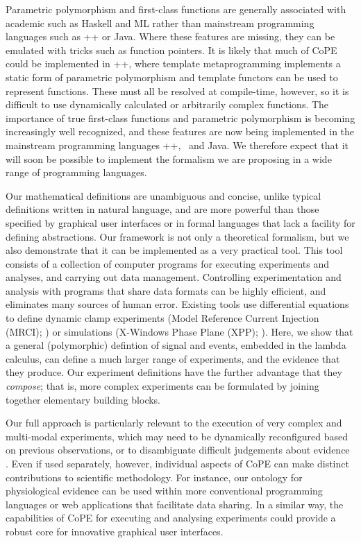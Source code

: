 Parametric polymorphism and first-class functions are generally
associated with academic such as Haskell and ML rather than mainstream
programming languages such as \C++ or Java. Where these features are
missing, they can be emulated with tricks such as function
pointers. It is likely that much of CoPE could be implemented in \C++,
where template metaprogramming implements a static form of parametric
polymorphism and template functors can be used to represent
functions. These must all be resolved at compile-time, however, so it
is difficult to use dynamically calculated or arbitrarily complex
functions. The importance of true first-class functions and parametric
polymorphism is becoming increasingly well recognized, and these
features are now being implemented in the mainstream
programming languages \C++, \Csharp\, and Java. We therefore expect
that it will soon be possible to implement the formalism we are
proposing in a wide range of programming languages.

%
% 
%
Our mathematical definitions are unambiguous and concise, unlike
typical definitions written in natural language, and are more powerful
than those specified by graphical user interfaces or in formal
languages that lack a facility for defining abstractions. Our
framework is not only a theoretical formalism, but we also demonstrate
that it can be implemented as a very practical tool. This tool
consists of a collection of computer programs for executing
experiments and analyses, and carrying out data
management. Controlling experimentation and analysis with programs
that share data formats can be highly efficient, and eliminates many
sources of human error. Existing tools use differential equations to
define dynamic clamp experiments (Model Reference Current Injection
(MRCI); \citep{Raikov2004}) or simulations (X-Windows Phase Plane
(XPP); \citep{Ermentrout1987}). Here, we show that a general
(polymorphic) defintion of signal and events, embedded in the lambda
calculus, can define a much larger range of experiments, and the
evidence that they produce. Our experiment definitions have the
further advantage that they \emph{compose}; that is, more complex
experiments can be formulated by joining together elementary building
blocks.

Our full approach is particularly relevant to the execution of very
complex and multi-modal experiments, which may need to be dynamically
reconfigured based on previous observations, or to disambiguate
difficult judgements about evidence \citep{Kriegeskorte2009}. Even
if used separately, however, individual aspects of CoPE can make
distinct contributions to scientific methodology. For instance, our
ontology for physiological evidence can be used within more
conventional programming languages or web applications that facilitate
data sharing. In a similar way, the capabilities of CoPE for executing
and analysing experiments could provide a robust core for innovative
graphical user interfaces.

